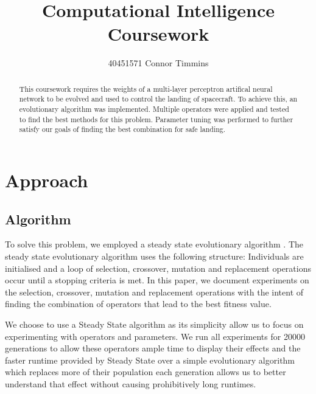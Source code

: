 \documentclass[sigconf]{acmart}
\begin{document}
\title{Computational Intelligence Coursework}

\author{40451571 Connor Timmins}



\begin{abstract}This coursework requires the weights of a multi-layer perceptron artifical neural network to be evolved and used to control the landing of spacecraft. To achieve this, an evolutionary algorithm was implemented. Multiple operators were applied and tested to find the best methods for this problem. Parameter tuning was performed to further satisfy our goals of finding the best combination for safe landing.
\end{abstract}





\maketitle

\section{Approach}
\subsection{Algorithm}
To solve this problem, we employed a steady state evolutionary algorithm \cite{SteadyState}.
The steady state evolutionary algorithm uses the following structure: Individuals are initialised and a loop of selection, crossover, mutation and replacement operations occur until a stopping criteria is met. In this paper, we document experiments on the selection, crossover, mutation and replacement operations with the intent of finding the combination of operators that lead to the best fitness value.

We choose to use a Steady State algorithm as its simplicity allow us to focus on experimenting with operators and parameters. We run all experiments for 20000 generations to allow these operators ample time to display their effects and the faster runtime provided by Steady State over a simple evolutionary algorithm which replaces more of their population each generation allows us to better understand that effect without causing prohibitively long runtimes.
\end{document}
